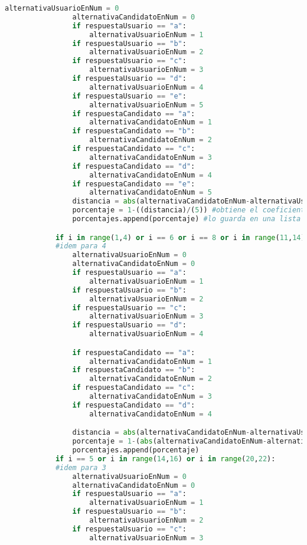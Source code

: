 \documentclass[a4paper]{article}
\begin{document}
\begin{lstlisting}[language=Python]
                alternativaUsuarioEnNum = 0
                alternativaCandidatoEnNum = 0
                if respuestaUsuario == "a":
                    alternativaUsuarioEnNum = 1
                if respuestaUsuario == "b":
                    alternativaUsuarioEnNum = 2
                if respuestaUsuario == "c":
                    alternativaUsuarioEnNum = 3
                if respuestaUsuario == "d":
                    alternativaUsuarioEnNum = 4
                if respuestaUsuario == "e":
                    alternativaUsuarioEnNum = 5
                if respuestaCandidato == "a":
                    alternativaCandidatoEnNum = 1
                if respuestaCandidato == "b":
                    alternativaCandidatoEnNum = 2
                if respuestaCandidato == "c":
                    alternativaCandidatoEnNum = 3
                if respuestaCandidato == "d":
                    alternativaCandidatoEnNum = 4
                if respuestaCandidato == "e":
                    alternativaCandidatoEnNum = 5
                distancia = abs(alternativaCandidatoEnNum-alternativaUsuarioEnNum)
                porcentaje = 1-((distancia)/(5)) #obtiene el coeficiente para la pregunta
                porcentajes.append(porcentaje) #lo guarda en una lista

            if i in range(1,4) or i == 6 or i == 8 or i in range(11,14) or i in range(16,18) or i == 22: 
            #idem para 4
                alternativaUsuarioEnNum = 0
                alternativaCandidatoEnNum = 0
                if respuestaUsuario == "a":
                    alternativaUsuarioEnNum = 1
                if respuestaUsuario == "b":
                    alternativaUsuarioEnNum = 2
                if respuestaUsuario == "c":
                    alternativaUsuarioEnNum = 3
                if respuestaUsuario == "d":
                    alternativaUsuarioEnNum = 4

                if respuestaCandidato == "a":
                    alternativaCandidatoEnNum = 1
                if respuestaCandidato == "b":
                    alternativaCandidatoEnNum = 2
                if respuestaCandidato == "c":
                    alternativaCandidatoEnNum = 3
                if respuestaCandidato == "d":
                    alternativaCandidatoEnNum = 4

                distancia = abs(alternativaCandidatoEnNum-alternativaUsuarioEnNum)
                porcentaje = 1-(abs(alternativaCandidatoEnNum-alternativaUsuarioEnNum))/(4)
                porcentajes.append(porcentaje)
            if i == 5 or i in range(14,16) or i in range(20,22):
            #idem para 3
                alternativaUsuarioEnNum = 0
                alternativaCandidatoEnNum = 0
                if respuestaUsuario == "a":
                    alternativaUsuarioEnNum = 1
                if respuestaUsuario == "b":
                    alternativaUsuarioEnNum = 2
                if respuestaUsuario == "c":
                    alternativaUsuarioEnNum = 3


\end{lstlisting}
\end{document}
